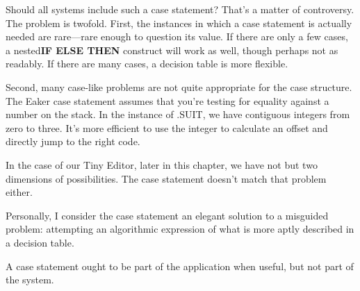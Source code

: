 Should all \Forth{} systems include such a case statement? That's
a matter of controversy. The problem is twofold. First, the instances in
which a case statement is actually needed are rare---rare enough to
question its value. If there are only a few cases, a nested\textbf{IF ELSE THEN}
construct will work as well, though perhaps not as readably. If there are
many cases, a decision table is more flexible.

Second, many case-like problems are not quite appropriate for the
case structure. The Eaker case statement assumes that you're testing for
equality against a number on the stack. In the instance of .SUIT, we have
contiguous integers from zero to three. It's more efficient to use the
integer to calculate an offset and directly jump to the right code.

In the case of our Tiny Editor, later in this chapter, we have not but
two dimensions of possibilities. The case statement doesn't match that
problem either.

Personally, I consider the case statement an elegant solution to a
misguided problem: attempting an algorithmic expression of what is
more aptly described in a decision table.

A case statement ought to be part of the application when useful,
but not part of the system.

